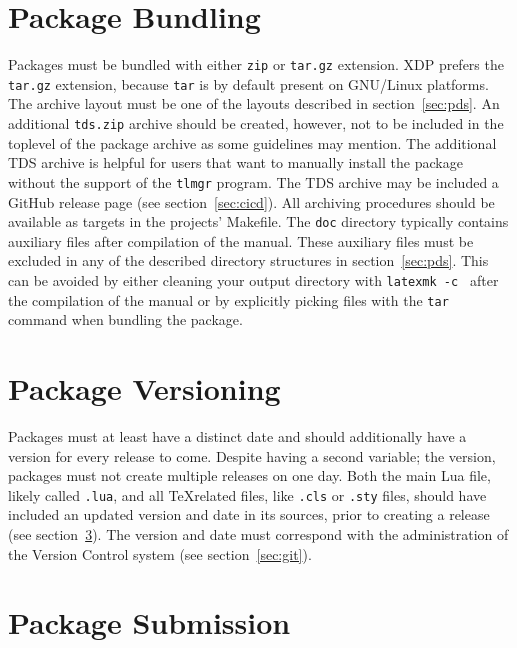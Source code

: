 \documentclass{xdpdoc}
\begin{document}
\begin{multicols}{2}
        \section{Package Bundling}\label{sec:bundling}

        Packages must be bundled with either \texttt{zip} or \texttt{tar.gz} extension.
        XDP prefers the \texttt{tar.gz} extension, because \texttt{tar} is by default present on GNU/Linux platforms.
        The archive layout must be one of the layouts described in section~\ref{sec:pds}.
        An additional \texttt{tds.zip} archive should be created, however, not to be included in the toplevel of the package archive as some guidelines may mention.
        The additional TDS archive is helpful for users that want to manually install the package without the support of the \texttt{tlmgr} program.
        The TDS archive may be included a GitHub release page (see section~\ref{sec:cicd}).
        All archiving procedures should be available as targets in the projects' Makefile.
        The \texttt{doc} directory typically contains auxiliary files after compilation of the manual.
        These auxiliary files must be excluded in any of the described directory structures in section~\ref{sec:pds}.
        This can be avoided by either cleaning your output directory with \texttt{latexmk -c } after the compilation of the manual
        or by explicitly picking files with the \texttt{tar} command when bundling the package.


        \section{Package Versioning}\label{sec:package-versioning}

        Packages must at least have a distinct date and should additionally have a version for every release to come.
        Despite having a second variable; the version, packages must not create multiple releases on one day.
        Both the main Lua file, likely called \texttt{.lua}, and all \TeX related files,
        like \texttt{.cls} or \texttt{.sty} files,
        should have included an updated version and date in its sources, prior to creating a release
        (see section~\ref{sec:submission}).
        The version and date must correspond with the administration of the Version Control system (see section~\ref{sec:git}).


        \section{Package Submission}\label{sec:submission}


\end{multicols}
\end{document}
